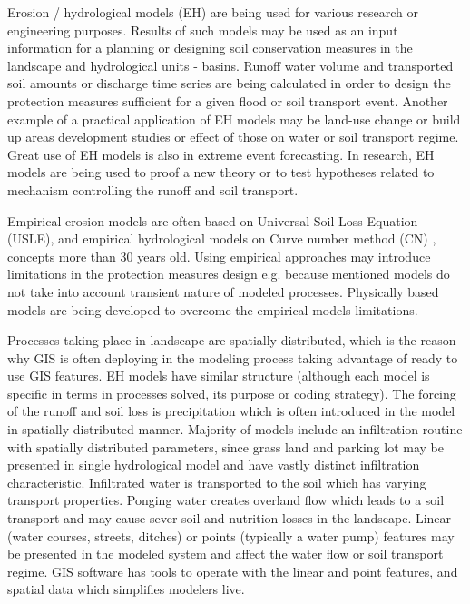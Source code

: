 Erosion / hydrological models (EH) are being used for various research or engineering purposes. 
Results of such models may be used as an input information for a planning 
or designing soil conservation measures in the landscape and hydrological units - basins. 
Runoff water volume and transported soil amounts
or discharge time series are being calculated
in order to design the protection measures sufficient for a given flood 
or soil transport event. Another example of a practical 
application of EH models may be land-use change or build up areas development studies 
or effect of those on water or soil transport regime. 
Great use of EH models is also in extreme event 
forecasting. In research, EH models 
are being used to proof a new theory or to test hypotheses related 
to mechanism controlling the runoff and soil transport.

Empirical erosion models are often based on Universal Soil Loss Equation (USLE), 
\cite{wischmeier1978,renard1997} and empirical hydrological models on Curve 
number method (CN) \cite{cronshey1986}, concepts more than 30 years old. 
Using empirical approaches may introduce limitations in the protection measures design e.g. 
because mentioned models do not take into account transient nature of modeled processes. 
Physically based models are being developed to overcome the empirical models limitations. 

Processes taking place in landscape are spatially distributed, which is the reason why GIS 
is often deploying in the modeling process taking advantage 
of ready to use GIS features. EH models have similar structure 
(although each model is specific in terms in processes solved, 
its purpose or coding strategy). The forcing of the runoff and soil loss is precipitation
which is often introduced in the model in spatially distributed 
manner. Majority of models include an infiltration routine with 
spatially distributed parameters, since grass land 
and parking lot may be presented in single hydrological model 
and have vastly distinct infiltration characteristic. Infiltrated 
water is transported to the soil which has varying transport properties. 
Ponging water creates overland flow which leads to a soil transport 
and may cause sever soil and nutrition losses in the landscape. 
Linear (water courses, streets, ditches) 
or points (typically a water pump) features may be presented  
in the modeled system and affect the water flow or soil transport regime. 
GIS software has tools to operate with the linear and point features, 
and spatial data which simplifies modelers live.

